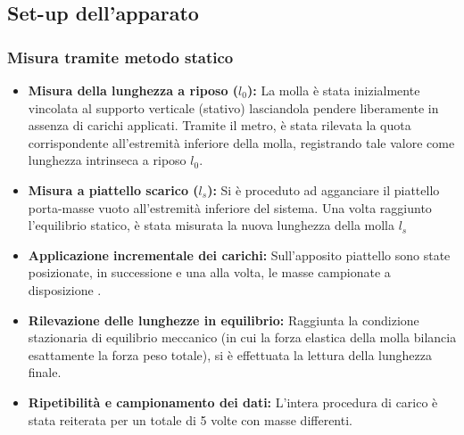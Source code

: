 \documentclass[a4paper,12pt]{article}
\begin{document}
 


\subsection{Set-up dell'apparato}     
\subsubsection{Misura tramite metodo statico}
\begin{itemize}
    \item \textbf{Misura della lunghezza a riposo ($l_0$):} La molla è stata inizialmente vincolata al supporto verticale (stativo) lasciandola pendere liberamente in assenza di carichi applicati. Tramite il metro, è stata rilevata la quota corrispondente all'estremità inferiore della molla, registrando tale valore come lunghezza intrinseca a riposo $l_0$.
    
    \item \textbf{Misura a piattello scarico ($l_s$):} Si è proceduto ad agganciare il piattello porta-masse vuoto all'estremità inferiore del sistema. Una volta raggiunto l'equilibrio statico, è stata misurata la nuova lunghezza della molla $l_s$
    
    \item \textbf{Applicazione incrementale dei carichi:} Sull'apposito piattello sono state posizionate, in successione e una alla volta, le masse campionate a disposizione .
    
    \item \textbf{Rilevazione delle lunghezze in equilibrio:} Raggiunta la condizione stazionaria di equilibrio meccanico (in cui la forza elastica della molla bilancia esattamente la forza peso totale), si è effettuata la lettura della lunghezza finale.
    
    \item \textbf{Ripetibilità e campionamento dei dati:} L'intera procedura di carico è stata reiterata per un totale di 5 volte con masse differenti.
\end{itemize}
\end{document}

